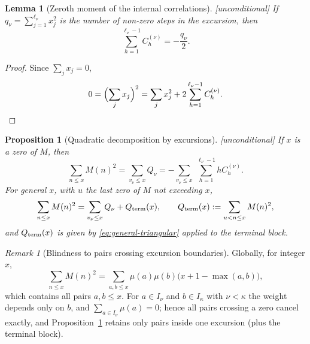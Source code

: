 \documentclass[11pt]{amsart}
\numberwithin{equation}{section}
\theoremstyle{plain}
\newtheorem{proposition}[theorem]{Proposition}
\newtheorem{lemma}[theorem]{Lemma}
\theoremstyle{definition}
\theoremstyle{remark}
\newtheorem{remark}[theorem]{Remark}
\begin{document}
\begin{lemma}[Zeroth moment of the internal correlations]
\label{lem:zeroth-corr}
\emph{[unconditional]} If $q_\nu=\sum_{j=1}^{\ell_\nu}x_j^2$ is the number
of non-zero steps in the excursion, then
\begin{equation}
\label{eq:zeroth-corr}
  \sum_{h=1}^{\ell_\nu-1}C_h^{(\nu)}=-\frac{q_\nu}{2}.
\end{equation}
\end{lemma}

\begin{proof}
Since $\sum_jx_j=0$,
\begin{equation}
\label{eq:proof_zeroth}
  0=\Bigl(\sum_jx_j\Bigr)^2
   =\sum_jx_j^2+2\sum_{h=1}^{\ell_\nu-1}C_h^{(\nu)}.
\end{equation}
\end{proof}

\begin{proposition}[Quadratic decomposition by excursions]
\label{prop:quadratic-decomp}
\emph{[unconditional]} If $x$ is a zero of $M$, then
\begin{equation}
\label{eq:quadratic-decomp-zero}
  \sum_{n\le x}M(n)^2
   =\sum_{v_\nu\le x}Q_\nu
   =-\sum_{v_\nu\le x}\ \sum_{h=1}^{\ell_\nu-1}hC_h^{(\nu)}.
\end{equation}
For general $x$, with $u$ the last zero of $M$ not exceeding $x$,
\begin{equation}
\label{eq:quadratic-decomp-general}
  \sum_{n\le x}M(n)^2=\sum_{v_\nu\le x}Q_\nu+Q_{\rm term}(x),
  \qquad
  Q_{\rm term}(x):=\sum_{u<n\le x}M(n)^2,
\end{equation}
and $Q_{\rm term}(x)$ is given by \eqref{eq:general-triangular} applied to
the terminal block.
\end{proposition}

\begin{remark}[Blindness to pairs crossing excursion boundaries]
\label{rem:blindness-quadratic}
Globally, for integer $x$,
\begin{equation}
\label{eq:global_quadratic}
  \sum_{n\le x}M(n)^2
  =\sum_{a,b\le x}\mu(a)\mu(b)\bigl(x+1-\max(a,b)\bigr),
\end{equation}
which contains all pairs $a,b\le x$. For $a\in I_\nu$ and $b\in I_\kappa$
with $\nu<\kappa$ the weight depends only on $b$, and
$\sum_{a\in I_\nu}\mu(a)=0$; hence all pairs crossing a zero cancel exactly,
and Proposition~\ref{prop:quadratic-decomp} retains only pairs inside one
excursion (plus the terminal block).
\end{remark}
\end{document}
